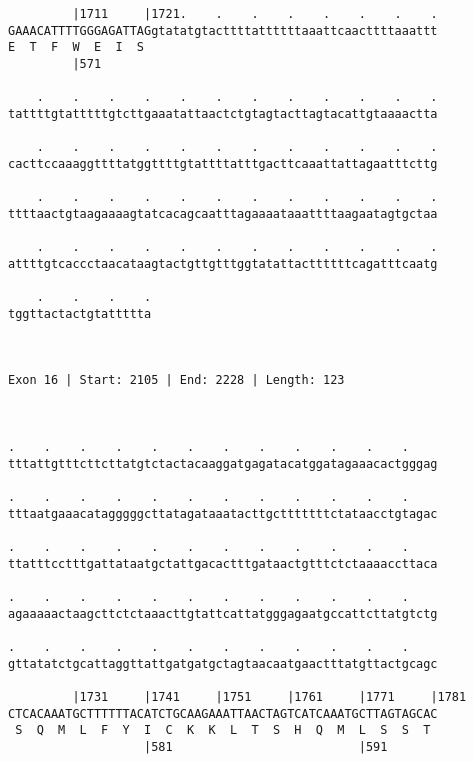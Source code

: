 \documentclass{article}
\begin{document}
\begin{Verbatim}
         |1711     |1721.    .    .    .    .    .    .    .
GAAACATTTTGGGAGATTAGgtatatgtacttttattttttaaattcaacttttaaattt
E  T  F  W  E  I  S                                         
         |571                                               
  
    .    .    .    .    .    .    .    .    .    .    .    .
tattttgtatttttgtcttgaaatattaactctgtagtacttagtacattgtaaaactta
                                                            
    .    .    .    .    .    .    .    .    .    .    .    .
cacttccaaaggttttatggttttgtattttatttgacttcaaattattagaatttcttg
                                                            
    .    .    .    .    .    .    .    .    .    .    .    .
ttttaactgtaagaaaagtatcacagcaatttagaaaataaattttaagaatagtgctaa
                                                            
    .    .    .    .    .    .    .    .    .    .    .    .
attttgtcaccctaacataagtactgttgtttggtatattacttttttcagatttcaatg
                                                            
    .    .    .    .
tggttactactgtattttta
                    
                    
 
Exon 16 | Start: 2105 | End: 2228 | Length: 123



.    .    .    .    .    .    .    .    .    .    .    .    
tttattgtttcttcttatgtctactacaaggatgagatacatggatagaaacactgggag
                                                            
.    .    .    .    .    .    .    .    .    .    .    .    
tttaatgaaacatagggggcttatagataaatacttgctttttttctataacctgtagac
                                                            
.    .    .    .    .    .    .    .    .    .    .    .    
ttatttcctttgattataatgctattgacactttgataactgtttctctaaaaccttaca
                                                            
.    .    .    .    .    .    .    .    .    .    .    .    
agaaaaactaagcttctctaaacttgtattcattatgggagaatgccattcttatgtctg
                                                            
.    .    .    .    .    .    .    .    .    .    .    .    
gttatatctgcattaggttattgatgatgctagtaacaatgaactttatgttactgcagc
                                                            
         |1731     |1741     |1751     |1761     |1771     |1781
CTCACAAATGCTTTTTTACATCTGCAAGAAATTAACTAGTCATCAAATGCTTAGTAGCAC
 S  Q  M  L  F  Y  I  C  K  K  L  T  S  H  Q  M  L  S  S  T 
                   |581                          |591       
  

\end{Verbatim}
\end{document}
